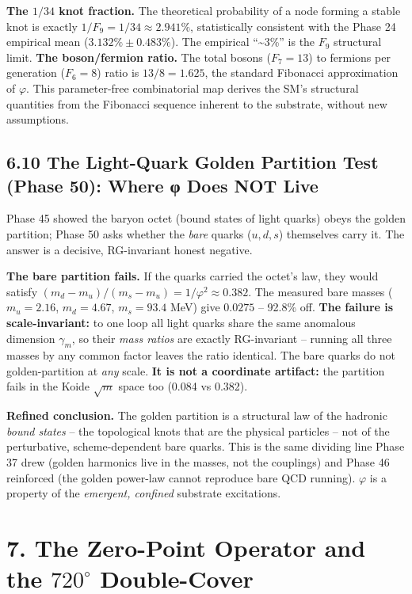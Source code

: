 \documentclass[
  11pt,
]{article}
\begin{document}
\textbf{The \(1/34\) knot fraction.} The theoretical probability of a
node forming a stable knot is exactly \(1/F_9 = 1/34 \approx 2.941\%\),
statistically consistent with the Phase 24 empirical mean
(\(3.132\% \pm 0.483\%\)). The empirical ``\textasciitilde3\%'' is the
\(F_9\) structural limit. \textbf{The boson/fermion ratio.} The total
bosons (\(F_7 = 13\)) to fermions per generation (\(F_6 = 8\)) ratio is
\(13/8 = 1.625\), the standard Fibonacci approximation of \(\varphi\).
This parameter-free combinatorial map derives the SM's structural
quantities from the Fibonacci sequence inherent to the substrate,
without new assumptions.

\subsection{6.10 The Light-Quark Golden Partition Test (Phase 50): Where
φ Does NOT
Live}\label{the-light-quark-golden-partition-test-phase-50-where-ux3c6-does-not-live}

Phase 45 showed the baryon octet (bound states of light quarks) obeys
the golden partition; Phase 50 asks whether the \emph{bare} quarks
(\(u, d, s\)) themselves carry it. The answer is a decisive,
RG-invariant honest negative.

\textbf{The bare partition fails.} If the quarks carried the octet's
law, they would satisfy
\((m_d - m_u)/(m_s - m_u) = 1/\varphi^2 \approx 0.382\). The measured
bare masses (\(m_u = 2.16\), \(m_d = 4.67\), \(m_s = 93.4\) MeV) give
\(0.0275\) -- 92.8\% off. \textbf{The failure is scale-invariant:} to
one loop all light quarks share the same anomalous dimension
\(\gamma_m\), so their \emph{mass ratios} are exactly RG-invariant --
running all three masses by any common factor leaves the ratio
identical. The bare quarks do not golden-partition at \emph{any} scale.
\textbf{It is not a coordinate artifact:} the partition fails in the
Koide \(\sqrt{m}\) space too (0.084 vs 0.382).

\textbf{Refined conclusion.} The golden partition is a structural law of
the hadronic \emph{bound states} -- the topological knots that are the
physical particles -- not of the perturbative, scheme-dependent bare
quarks. This is the same dividing line Phase 37 drew (golden harmonics
live in the masses, not the couplings) and Phase 46 reinforced (the
golden power-law cannot reproduce bare QCD running). \(\varphi\) is a
property of the \emph{emergent, confined} substrate excitations.

\section{\texorpdfstring{7. The Zero-Point Operator and the
\(720^{\circ}\)
Double-Cover}{7. The Zero-Point Operator and the 720\^{}\{\textbackslash circ\} Double-Cover}}\label{the-zero-point-operator-and-the-720circ-double-cover}
\end{document}
